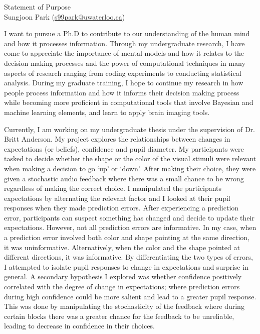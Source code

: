 \documentclass[12pt]{article}
\let\oldcenter\center
\let\oldendcenter\endcenter
\renewenvironment{center}{\setlength\topsep{-1pt}\oldcenter}{\oldendcenter}
\begin{document}
\begin{center}
{\Large Statement of Purpose} \\
{\normalsize Sungjoon Park (\href{mailto:s99park@uwaterloo.ca}{s99park@uwaterloo.ca})}
\end{center}

I want to pursue a Ph.D to contribute to our understanding of the human mind and how it processes information. Through my undergraduate research, I have come to appreciate the importance of mental models and how it relates to the decision making processes and the power of computational techniques in many aspects of research ranging from coding experiments to conducting statistical analysis. During my graduate training, I hope to continue my research in how people process information and how it informs their decision making process while becoming more proficient in computational tools that involve Bayesian and machine learning elements, and learn to apply brain imaging tools.

Currently, I am working on my undergraduate thesis under the supervision of Dr. Britt Anderson. My project explores the relationships between changes in expectations (or beliefs), confidence and pupil diameter. My participants were tasked to decide whether the shape or the color of the visual stimuli were relevant when making a decision to go `up' or `down'. After making their choice, they were given a stochastic audio feedback where there was a small chance to be wrong regardless of making the correct choice. I manipulated the participants expectations by alternating the relevant factor and I looked at their pupil responses when they made prediction errors. After experiencing a prediction error, participants can suspect something has changed and decide to update their expectations. However, not all prediction errors are informative. In my case, when a prediction error involved both color and shape pointing at the same direction, it was uninformative. Alternatively, when the color and the shape pointed at different directions, it was informative. By differentiating the two types of errors, I attempted to isolate pupil responses to change in expectations and surprise in general. A secondary hypothesis I explored was whether confidence positively correlated with the degree of change in expectations; where prediction errors during high confidence could be more salient and lead to a greater pupil response. This was done by manipulating the stochasticity of the feedback where during certain blocks there was a greater chance for the feedback to be unreliable, leading to decrease in confidence in their choices.
\end{document}
